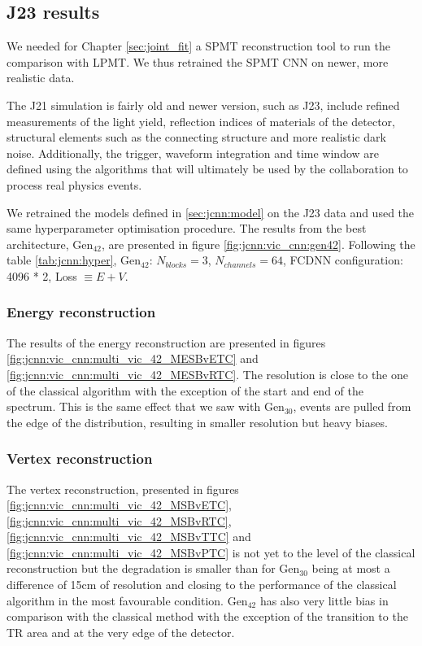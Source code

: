 \documentclass[../main.tex]{subfiles}
\begin{document}
\subsection{J23 results}

We needed for Chapter \ref{sec:joint_fit} a SPMT reconstruction tool to run the comparison with LPMT. We thus retrained the SPMT CNN on newer, more realistic data.

The J21 simulation is fairly old and newer version, such as J23, include refined measurements of the light yield, reflection indices of materials of the detector, structural elements such as the connecting structure and more realistic dark noise. Additionally, the trigger, waveform integration and time window are defined using the algorithms that will ultimately be used by the collaboration to process real physics events.

We retrained the models defined in \ref{sec:jcnn:model} on the J23 data and used the same hyperparameter optimisation procedure. The results from the best architecture, $\mathrm{Gen}_{42}$, are presented in figure \ref{fig:jcnn:vic_cnn:gen42}. Following the table \ref{tab:jcnn:hyper}, $\mathrm{Gen}_{42}$: $N_{blocks} = 3$, $N_{channels} = 64$, FCDNN configuration: 4096 * 2, Loss $\equiv E+V$.

\subsubsection{Energy reconstruction}

The results of the energy reconstruction are presented in figures \ref{fig:jcnn:vic_cnn:multi_vic_42_MESBvETC} and \ref{fig:jcnn:vic_cnn:multi_vic_42_MESBvRTC}. The resolution is close to the one of the classical algorithm with the exception of the start and end of the spectrum. This is the same effect that we saw with $\mathrm{Gen}_{30}$, events are pulled from the edge of the distribution, resulting in smaller resolution but heavy biases.

\subsubsection{Vertex reconstruction}

The vertex reconstruction, presented in figures \ref{fig:jcnn:vic_cnn:multi_vic_42_MSBvETC}, \ref{fig:jcnn:vic_cnn:multi_vic_42_MSBvRTC}, \ref{fig:jcnn:vic_cnn:multi_vic_42_MSBvTTC} and \ref{fig:jcnn:vic_cnn:multi_vic_42_MSBvPTC} is not yet to the level of the classical reconstruction but the degradation is smaller than for $\mathrm{Gen}_{30}$ being at most a difference of 15cm of resolution and closing to the performance of the classical algorithm in the most favourable condition. $\mathrm{Gen}_{42}$ has also very little bias in comparison with the classical method with the exception of the transition to the TR area and at the very edge of the detector.
\end{document}
